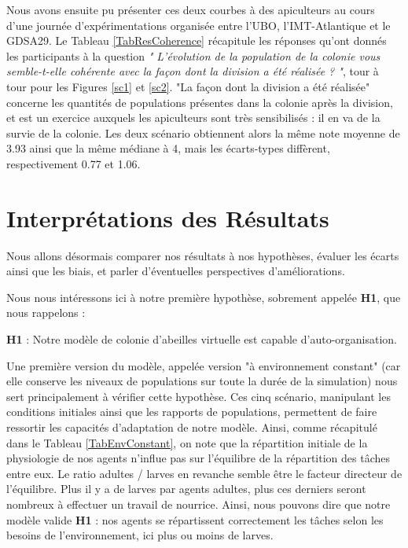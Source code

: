 	Nous avons ensuite pu présenter ces deux courbes à des apiculteurs au cours d'une journée d'expérimentations organisée entre l'UBO, l'IMT-Atlantique et le GDSA29. Le Tableau \ref{TabResCoherence} récapitule les réponses qu'ont donnés les participants à la question \textit{" L'évolution de la population de la colonie vous semble-t-elle cohérente avec la façon dont la division a été réalisée ? "}, tour à tour pour les Figures \ref{sc1} et \ref{sc2}. "La façon dont la division a été réalisée" concerne les quantités de populations présentes dans la colonie après la division, et est un exercice auxquels les apiculteurs sont très sensibilisés : il en va de la survie de la colonie. Les deux scénario obtiennent alors la même note moyenne de 3.93 ainsi que la même médiane à 4, mais les écarts-types diffèrent, respectivement 0.77 et 1.06.
	
	
	\section{Interprétations des Résultats}

	Nous allons désormais comparer nos résultats à nos hypothèses, évaluer les écarts ainsi que les biais, et parler d'éventuelles perspectives d'améliorations.
	
		Nous nous intéressons ici à notre première hypothèse, sobrement appelée \textbf{H1}, que nous rappelons : 
		
		\textbf{H1} : Notre modèle de colonie d'abeilles virtuelle est capable d'auto-organisation.
		
		Une première version du modèle, appelée version "à environnement constant" (car elle conserve les niveaux de populations sur toute la durée de la simulation) nous sert principalement à vérifier cette hypothèse. Ces cinq scénario, manipulant les conditions initiales ainsi que les rapports de populations, permettent de faire ressortir les capacités d'adaptation de notre modèle. Ainsi, comme récapitulé dans le Tableau \ref{TabEnvConstant}, on note que la répartition initiale de la physiologie de nos agents n'influe pas sur l'équilibre de la répartition des tâches entre eux. Le ratio adultes / larves en revanche semble être le facteur directeur de l'équilibre. Plus il y a de larves par agents adultes, plus ces derniers seront nombreux à effectuer un travail de nourrice. Ainsi, nous pouvons dire que notre modèle valide \textbf{H1} : nos agents se répartissent correctement les tâches selon les besoins de l'environnement, ici plus ou moins de larves.
		
